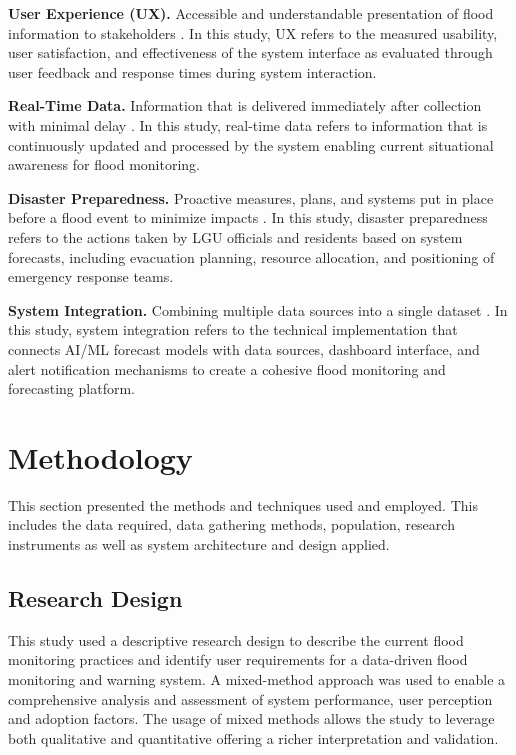 \documentclass{research}
\begin{document}
\textbf{User Experience (UX).} Accessible and understandable presentation of flood information to stakeholders \cite{tolentino2022real}. In this study, UX refers to the measured usability, user satisfaction, and effectiveness of the system interface as evaluated through user feedback and response times during system interaction.

\textbf{Real-Time Data.} Information that is delivered immediately after collection with minimal delay \cite{te2024smart}. In this study, real-time data refers to information that is continuously updated and processed by the system enabling current situational awareness for flood monitoring.

\textbf{Disaster Preparedness.} Proactive measures, plans, and systems put in place before a flood event to minimize impacts \cite{aldhafiri2025leveraging,hammood2021systematic}. In this study, disaster preparedness refers to the actions taken by LGU officials and residents based on system forecasts, including evacuation planning, resource allocation, and positioning of emergency response teams.

\textbf{System Integration.} Combining multiple data sources into a single dataset \cite{koutsovili2023early}. In this study, system integration refers to the technical implementation that connects AI/ML forecast models with data sources, dashboard interface, and alert notification mechanisms to create a cohesive flood monitoring and forecasting platform.

\clearpage

\chapter{Methodology}

This section presented the methods and techniques used and employed. This includes the data required, data gathering methods, population, research instruments as well as system architecture and design applied.

\section{Research Design}

This study used a descriptive research design to describe the current flood monitoring practices and identify user requirements for a data-driven flood monitoring and warning system. A mixed-method approach was used to enable a comprehensive analysis and assessment of system performance, user perception and adoption factors. The usage of mixed methods allows the study to leverage both qualitative and quantitative offering a richer interpretation and validation.
\end{document}
